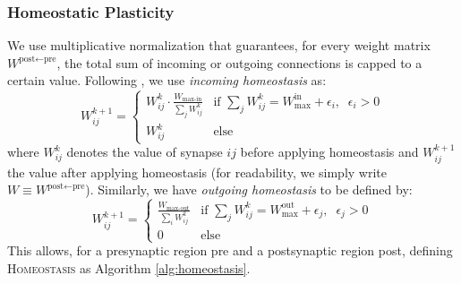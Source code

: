 \documentclass{article}
\begin{document}
\subsubsection*{Homeostatic Plasticity}
We use multiplicative normalization that guarantees, for every weight matrix $W^{\textrm{post}\leftarrow\textrm{pre}}$, the total sum of incoming or outgoing connections is capped to a certain value. Following , we use \textit{incoming homeostasis} as:
\begin{equation}
W_{ij}^{k+1}=
\begin{cases}
 W_{ij}^{k}\cdot\frac{W_\textrm{max-in}}{\sum_{j}W^{k}_{ij}} & \text{if }\sum_{j}W^{k}_{ij} = W_\textrm{max}^\textrm{in} + \epsilon_i, \;\; \epsilon_i > 0 \\[1.2ex]
W^k_{ij}& \textrm{else}
\end{cases}
\end{equation}
where $W^k_{ij}$ denotes the value of synapse $ij$ before applying homeostasis and $W^{k+1}_{ij}$ the value after applying homeostasis (for readability, we simply write $W \equiv W^{\textrm{post}\leftarrow\textrm{pre}}$).
Similarly, we have \textit{outgoing homeostasis} to be defined by:
\begin{equation}
W_{ij}^{k+1} =
\begin{cases}
 \frac{W_\textrm{max-out}}{\sum_{i}W^k_{ij}} & \text{if }\sum_{j}W^k_{ij} = W_\textrm{max}^\textrm{out} + \epsilon_j, \;\; \epsilon_j > 0 \\[1.2ex]
0 & \textrm{else}
\end{cases}
\end{equation}
This allows, for a presynaptic region pre and a postsynaptic region post, defining \textsc{Homeostasis} as Algorithm \ref{alg:homeostasis}.
\end{document}

